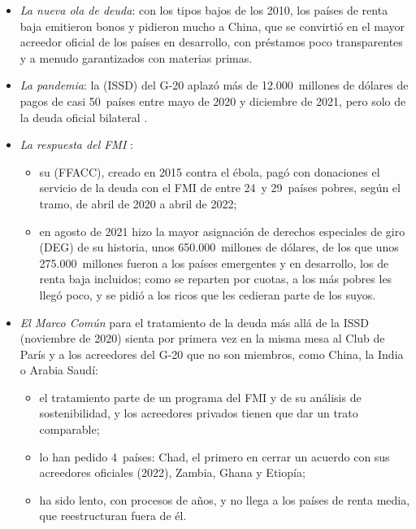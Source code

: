 \documentclass[11pt]{article}
\begin{document}
\begin{itemize}
\item \emph{La nueva ola de deuda}: con los tipos bajos de los 2010, los países de renta baja emitieron bonos y pidieron mucho a China, que se convirtió en el mayor acreedor oficial de los países en desarrollo, con préstamos poco transparentes y a menudo garantizados con materias primas\nocite{HornReinhartTrebesch2021}.
\item \emph{La pandemia}: la  (ISSD) del G-20 aplazó más de 12.000~millones de dólares de pagos de casi 50~países entre mayo de 2020 y diciembre de 2021, pero solo de la deuda oficial bilateral\nocite{G202020DSSI,BancoMundial2022DSSI} .
\item \emph{La respuesta del FMI} :
  \begin{itemize}
  \item su  (FFACC), creado en 2015 contra el ébola, pagó con donaciones el servicio de la deuda con el FMI de entre 24~y 29~países pobres, según el tramo, de abril de 2020 a abril de 2022\nocite{FMI2021FFACC};
  \item en agosto de 2021 hizo la mayor asignación de derechos especiales de giro (DEG) de su historia, unos 650.000~millones de dólares, de los que unos 275.000~millones fueron a los países emergentes y en desarrollo, los de renta baja incluidos; como se reparten por cuotas, a los más pobres les llegó poco, y se pidió a los ricos que les cedieran parte de los suyos\nocite{FMI2021DEG}.
  \end{itemize}
\item \emph{El Marco Común} para el tratamiento de la deuda más allá de la ISSD (noviembre de 2020) sienta por primera vez en la misma mesa al Club de París y a los acreedores del G-20 que no son miembros, como China, la India o Arabia Saudí\nocite{G202020MarcoComun}:
  \begin{itemize}
  \item el tratamiento parte de un programa del FMI y de su análisis de sostenibilidad, y los acreedores privados tienen que dar un trato comparable;
  \item lo han pedido 4~países: Chad, el primero en cerrar un acuerdo con sus acreedores oficiales (2022), Zambia, Ghana y Etiopía\nocite{Francia2026MarcoComun};
  \item ha sido lento, con procesos de años, y no llega a los países de renta media, que reestructuran fuera de él.

\end{itemize}
\end{itemize}
\end{document}
